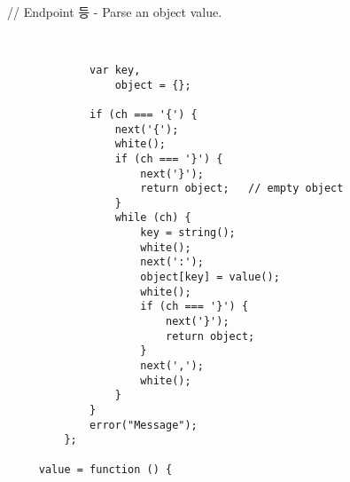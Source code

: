 \documentclass{article}
\begin{document}
// Endpoint 등 - Parse an object value.
\begin{lstlisting}


             var key,
                 object = {};

             if (ch === '{') {
                 next('{');
                 white();
                 if (ch === '}') {
                     next('}');
                     return object;   // empty object
                 }
                 while (ch) {
                     key = string();
                     white();
                     next(':');
                     object[key] = value();
                     white();
                     if (ch === '}') {
                         next('}');
                         return object;
                     }
                     next(',');
                     white();
                 }
             }
             error("Message");
         };

     value = function () {
\end{lstlisting}
\end{document}
